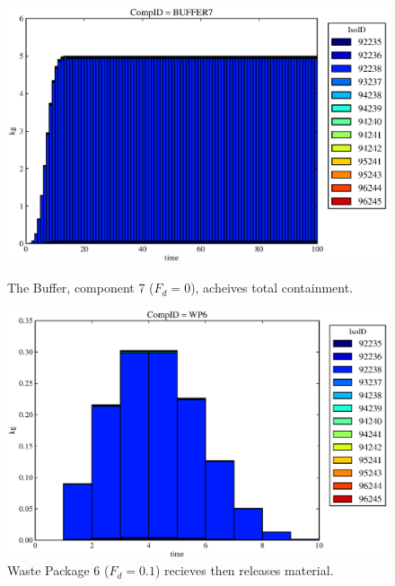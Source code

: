 \begin{figure}[ht]
\begin{minipage}[b]{0.45\linewidth}
  \includegraphics[width=\textwidth]{./chapters/demonstration/base/drIII3.eps}
  \caption[Case DRIII Buffer Contaminants]{
    The Buffer, component 7 ($F_d=0$), acheives total containment.
    }
  \label{fig:drIIIbuff}

\end{minipage}
\hspace{0.05\linewidth}
\begin{minipage}[b]{0.45\linewidth}
  \includegraphics[width=\textwidth]{./chapters/demonstration/base/drIII2.eps}
  \caption[Case DRIII Waste Package Contaminants.]{ 
    Waste Package 6 ($F_d = 0.1$) recieves then releases material. 
    }
  \label{fig:drIIIwp6}


\end{minipage}
\end{figure}
